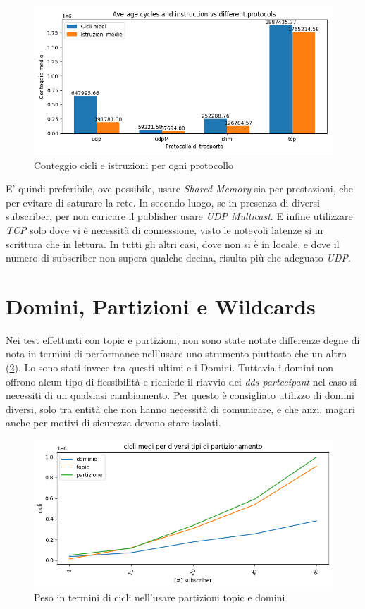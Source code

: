 \begin{figure}[H]
    \includegraphics[width=\textwidth]{./results/test1_cyclinstr.png} 
        \caption{Conteggio cicli e istruzioni per ogni protocollo}\label{fig:test3_cycle_different_protocols}
\end{figure}
E' quindi preferibile, ove possibile, usare \emph{Shared Memory} sia per prestazioni, che per evitare di saturare la rete. In secondo luogo, se in presenza di diversi subscriber, per non caricare il publisher usare \emph{UDP Multicast}. E infine utilizzare \emph{TCP} solo dove vi è necessità di connessione, visto le notevoli latenze si in scrittura che in lettura. In tutti gli altri casi, dove non si è in locale, e dove il numero di subscriber non supera qualche decina, risulta più che adeguato \emph{UDP}.

\section{Domini, Partizioni e Wildcards}
Nei test effettuati con topic e partizioni, non sono state notate differenze degne di nota in termini di performance nell'usare uno strumento piuttosto che un altro (\ref{fig:test2parttopicdomain}). Lo sono stati invece tra questi ultimi e i Domini. Tuttavia i domini non offrono alcun tipo di flessibilità e richiede il riavvio dei \emph{dds-partecipant} nel caso si necessiti di un qualsiasi cambiamento. Per questo è consigliato utilizzo di domini diversi, solo tra entità che non hanno necessità di comunicare, e che anzi, magari anche per motivi di sicurezza devono stare isolati. 


\begin{figure}[H]
    \includegraphics[width=\textwidth]{./results/test2_cicli_partvstopicvsdomaain.png} 
        \caption{Peso in termini di cicli nell'usare partizioni topic e domini}\label{fig:test2parttopicdomain}
\end{figure}

